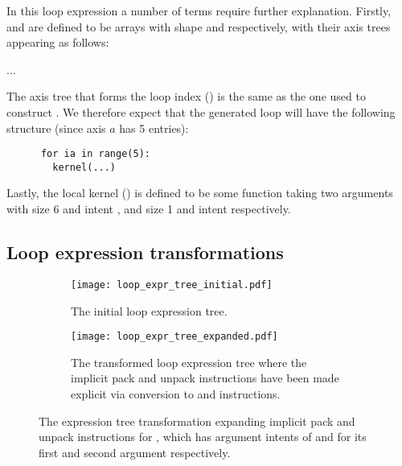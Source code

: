 \documentclass[thesis]{subfiles}
\begin{document}
In this loop expression a number of terms require further explanation.
Firstly,  and  are defined to be arrays with shape  and  respectively, with their axis trees appearing as follows:

...

The axis tree that forms the loop index () is the same as the one used to construct .
We therefore expect that the generated loop will have the following structure (since axis $a$ has 5 entries):

\begin{center}
  \begin{minipage}{.25\textwidth}
    \begin{verbatim}
      for ia in range(5):
        kernel(...)
    \end{verbatim}
  \end{minipage}
\end{center}


Lastly, the local kernel () is defined to be some function taking two arguments with size 6 and intent , and size 1 and intent  respectively.

\subsection{Loop expression transformations}

\begin{figure}
  \centering

  \begin{subfigure}[t]{.3\textwidth}
    \texttt{[image: loop\_expr\_tree\_initial.pdf]}
    \caption{The initial loop expression tree.}
    \label{fig:loop_expr_tree_transform_initial}
  \end{subfigure}
  \hfill
  \begin{subfigure}[t]{.68\textwidth}
    \texttt{[image: loop\_expr\_tree\_expanded.pdf]}
    \caption{The transformed loop expression tree where the implicit pack and unpack instructions have been made explicit via conversion to  and  instructions.}
    \label{fig:loop_expr_tree_transform_expanded}
  \end{subfigure}

  \caption{
    The expression tree transformation expanding implicit pack and unpack instructions for , which has argument intents of  and  for its first and second argument respectively.
  }
  \label{fig:loop_expr_tree_transform}
\end{figure}
\end{document}

